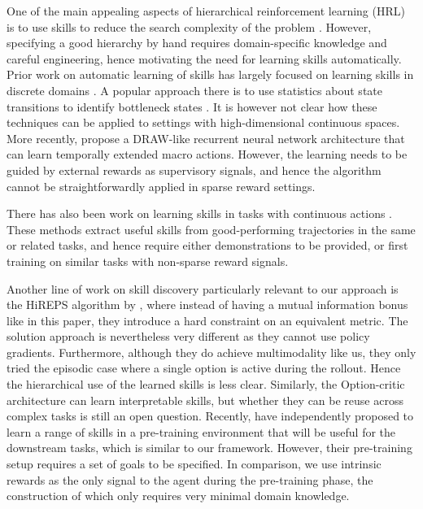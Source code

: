 \documentclass{article} %
\begin{document}
One of the main appealing aspects of hierarchical reinforcement learning (HRL) is to use skills to reduce the search complexity of the problem \citep{parr1998reinforcement, sutton1999between, dietterich2000hierarchical}.
However, specifying a good hierarchy by hand requires domain-specific knowledge and careful engineering, hence motivating the need for learning skills automatically. Prior work on automatic learning of skills has largely focused on learning skills in discrete domains \citep{chentanez2004intrinsically, vigorito2010intrinsically}.
A popular approach there is to use statistics about state transitions to identify bottleneck states \citep{stolle2002learning, mannor2004dynamic, csimcsek2005identifying}.
It is however not clear how these techniques can be applied to settings with high-dimensional continuous spaces.
More recently, \cite{mnih2016strategic} propose a DRAW-like \citep{gregor2015draw} recurrent neural network architecture that can learn temporally extended macro actions.
However, the learning needs to be guided by external rewards as supervisory signals, and hence the algorithm cannot be straightforwardly applied in sparse reward settings.%

There has also been work on learning skills in tasks with continuous actions  \citep{schaal2005learning, konidaris2011autonomous, daniel2013autonomous, ranchod2015nonparametric}.
These methods extract useful skills from good-performing trajectories in the same or related tasks, and hence require either demonstrations to be provided, or first training on similar tasks with non-sparse reward signals. 

Another line of work on skill discovery particularly relevant to our approach is the HiREPS algorithm by \cite{daniel2012hierarchical}, where instead of having a mutual information bonus like in this paper, they introduce a hard constraint on an equivalent metric. The solution approach is nevertheless very different as they cannot use policy gradients. Furthermore, although they do achieve multimodality like us, they only tried the episodic case where a single option is active during the rollout. Hence the hierarchical use of the learned skills is less clear. Similarly, the Option-critic architecture \citep{bacon2016option} can learn interpretable skills, but whether they can be reuse across complex tasks is still an open question. Recently, \cite{heess2016learning} have independently proposed to learn a range of skills in a pre-training environment that will be useful for the downstream tasks, which is similar to our framework.
However, their pre-training setup requires a set of goals to be specified.
In comparison, we use intrinsic rewards as the only signal to the agent during the pre-training phase, the construction of which only requires very minimal domain knowledge.%
\end{document}
